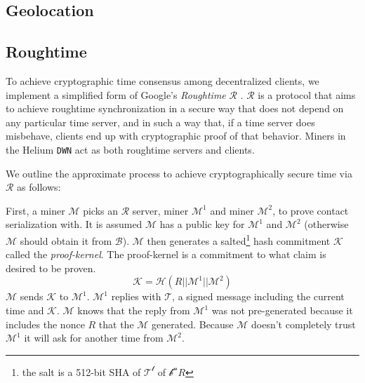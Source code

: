\documentclass[letterpaper,11pt]{article}
\begin{document}
\subsection{Geolocation}

\subsection{Roughtime} \label{roughtime}

To achieve cryptographic time consensus among decentralized clients, we implement a simplified form of Google's \textit{Roughtime} $\mathcal{R}$ \cite{roughtime}. $\mathcal{R}$ is a protocol that aims to achieve roughtime synchronization in a secure way that does not depend on any particular time server, and in such a way that, if a time server does misbehave, clients end up with cryptographic proof of that behavior. Miners in the Helium \verb|DWN| act as both roughtime servers and clients.\newline

We outline the approximate process to achieve cryptographically secure time via $\mathcal{R}$ as follows:\newline

First, a miner $\mathcal{M}$ picks an $\mathcal{R}$ server, miner $\mathcal{M^1}$ and miner $\mathcal{M^2}$, to prove contact serialization with. It is assumed $\mathcal{M}$ has a public key for $\mathcal{M^1}$ and $\mathcal{M^2}$ (otherwise $\mathcal{M}$ should obtain it from $\mathcal{B}$). $\mathcal{M}$ then generates a salted\footnote{the salt is a 512-bit SHA of $\mathcal{T^t}$ of $\mathcal{b^n}$$R$} hash commitment $\mathcal{K}$ called the \textit{proof-kernel}. The proof-kernel is a commitment to what claim is desired to be proven. $$\mathcal{K} = \mathcal{H}(R || \mathcal{M^1} || \mathcal{M^2})$$ $\mathcal{M}$ sends $\mathcal{K}$ to $\mathcal{M^1}$. $\mathcal{M^1}$ replies with $\mathcal{T}$, a signed message including the current time and $\mathcal{K}$. $\mathcal{M}$ knows that the reply from $\mathcal{M^1}$ was not pre-generated because it includes the nonce $R$ that the $\mathcal{M}$ generated. Because $\mathcal{M}$ doesn't completely trust $\mathcal{M^1}$ it will ask for another time from $\mathcal{M^2}$.\newline
\end{document}

